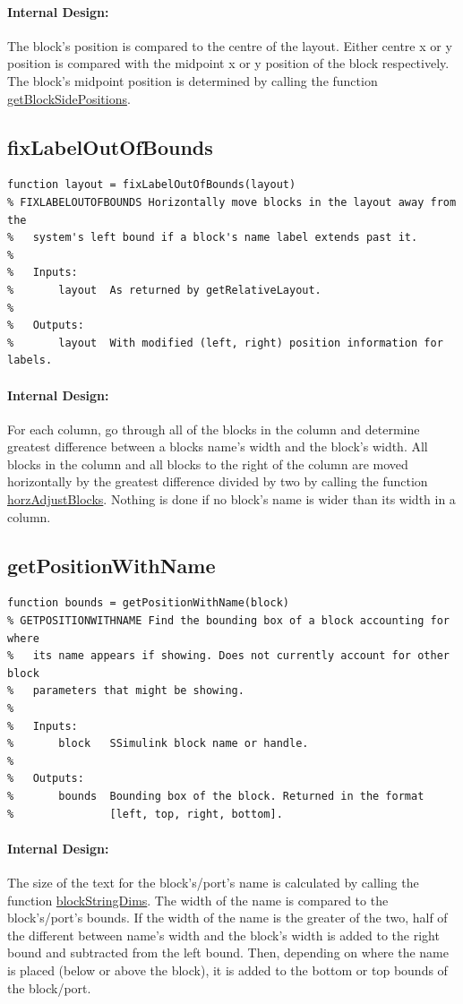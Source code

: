 \documentclass[12pt,letterpaper]{report}
\begin{document}
\paragraph{Internal Design:} The block's position is compared to the centre of the layout. Either centre x or y position is compared with the midpoint x or y position of the block respectively. The block's midpoint position is determined by calling the function \hyperlink{getBlockSidePositions}{getBlockSidePositions}. 

\subsection{fixLabelOutOfBounds}
\begin{lstlisting}
function layout = fixLabelOutOfBounds(layout)
% FIXLABELOUTOFBOUNDS Horizontally move blocks in the layout away from the
%   system's left bound if a block's name label extends past it.
%
%   Inputs:
%       layout  As returned by getRelativeLayout.
%
%   Outputs:
%       layout  With modified (left, right) position information for labels.
\end{lstlisting}
\paragraph{Internal Design:} For each column, go through all of the blocks in the column and determine greatest difference between a blocks name's width and the block's width. All blocks in the column and all blocks to the right of the column are moved horizontally by the greatest difference divided by two by calling the function \hyperlink{horzAdjustBlocks}{horzAdjustBlocks}. Nothing is done if no block's name is wider than its width in a column.

\subsection{getPositionWithName}
\begin{lstlisting}
function bounds = getPositionWithName(block)
% GETPOSITIONWITHNAME Find the bounding box of a block accounting for where
%   its name appears if showing. Does not currently account for other block
%   parameters that might be showing.
%
%   Inputs:
%       block   SSimulink block name or handle.
%
%   Outputs:
%       bounds  Bounding box of the block. Returned in the format
%               [left, top, right, bottom].
\end{lstlisting}
\paragraph{Internal Design:} The size of the text for the block's/port's name is calculated by calling the function \hyperlink{blockStringDims}{blockStringDims}. The width of the name is compared to the block's/port's bounds. If the width of the name is the greater of the two, half of the different between name's width and the block's width is added to the right bound and subtracted from the left bound. Then, depending on where the name is placed (below or above the block), it is added to the bottom or top bounds of the block/port.
\end{document}
